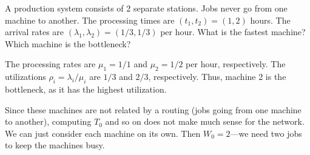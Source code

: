 \begin{question}
  A production system consists of 2 separate stations. Jobs never go
  from one machine to another. The processing times are
  $(t_1, t_2) = (1, 2)$ hours. The arrival rates are
  $(\lambda_1, \lambda_2) = (1/3, 1/3)$ per hour. What is the fastest
  machine? Which machine is the bottleneck? 
  \begin{solution}
    The processing rates are $\mu_1=1/1$ and $\mu_2 = 1/2$ per hour,
    respectively. The utilizations $\rho_i=\lambda_i/\mu_i$ are $1/3$
    and $2/3$, respectively. Thus, machine 2 is the bottleneck, as it
    has the highest utilization.

    Since these machines are not related by a routing (jobs going from
    one machine to another), computing $T_0$ and so on does not make
    much sense for the network. We can just consider each machine on
    its own. Then $W_0=2$---we need two jobs to keep the machines
    busy.

  \end{solution}
\end{question}



